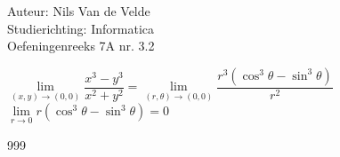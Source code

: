 \documentclass[a4paper]{article}
\newcommand{\llim}{\lim\limits}
\begin{document}
  
\noindent \large Auteur: Nils Van de Velde \\
\noindent \large Studierichting: Informatica\\
\noindent \large Oefeningenreeks 7A nr. 3.2\\

\medskip

\normalsize

$\llim_{(x,y)\rightarrow(0,0)}\dfrac{x^3-y^3}{x^2+y^2}=\llim_{(r,\theta)\rightarrow(0,0)}\dfrac{r^3(\cos^3\theta-\sin^3\theta)}{r^2}$\\

$\llim_{r\rightarrow 0}r(\cos^3\theta-\sin^3\theta)=0$\\

\begin{thebibliography}{999}
\end{thebibliography}
\end{document}
